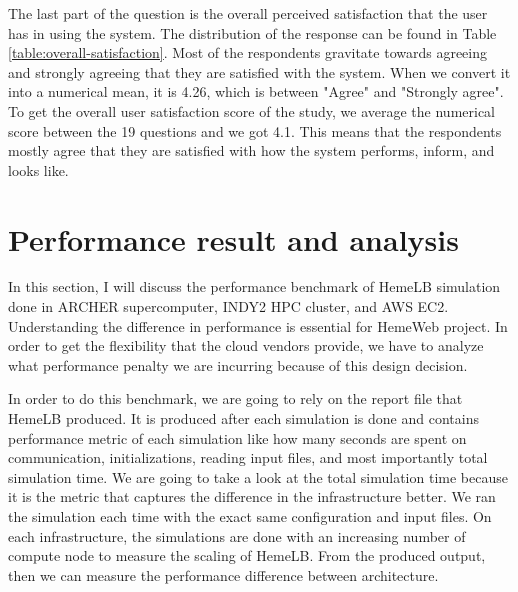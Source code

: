 The last part of the question is the overall perceived satisfaction that the user has in using the system. The distribution of the response can be found in Table \ref{table:overall-satisfaction}. Most of the respondents gravitate towards agreeing and strongly agreeing that they are satisfied with the system. When we convert it into a numerical mean, it is 4.26, which is between "Agree" and "Strongly agree". To get the overall user satisfaction score of the study, we average the numerical score between the 19 questions and we got 4.1. This means that the respondents mostly agree that they are satisfied with how the system performs,  inform, and looks like.

\section{Performance result and analysis}

In this section, I will discuss the performance benchmark of HemeLB simulation done in ARCHER supercomputer, INDY2 HPC cluster, and AWS EC2. Understanding the difference in performance is essential for HemeWeb project. In order to get the flexibility that the cloud vendors provide, we have to analyze what performance penalty we are incurring because of this design decision. 

In order to do this benchmark, we are going to rely on the report file that HemeLB produced. It is produced after each simulation is done and contains performance metric of each simulation like how many seconds are spent on communication, initializations, reading input files, and most importantly total simulation time. We are going to take a look at the total simulation time because it is the metric that captures the difference in the infrastructure better. We ran the simulation each time with the exact same configuration and input files. On each infrastructure, the simulations are done with an increasing number of compute node to measure the scaling of HemeLB.  From the produced output, then we can measure the performance difference between architecture.





